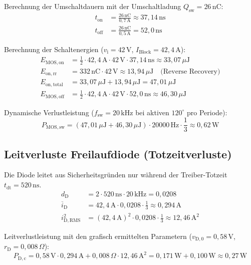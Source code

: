 Berechnung der Umschaltdauern mit der Umschaltladung $Q_{\mathrm{sw}} = 26\,\mathrm{nC}$:
\begin{align}
    t_{\mathrm{on}} &= \frac{26\,\mathrm{nC}}{0{,}7\,\mathrm{A}} \approx 37{,}14\,\mathrm{ns} \\
    t_{\mathrm{off}} &= \frac{26\,\mathrm{nC}}{0{,}5\,\mathrm{A}} = 52{,}0\,\mathrm{ns}
\end{align}

Berechnung der Schaltenergien ($v_{\mathrm{i}} = 42\,\mathrm{V}$, $I_{\mathrm{Block}} = 42{,}4\,\mathrm{A}$):
\begin{align}
    E_{\mathrm{MOS,on}} &= \frac{1}{2} \cdot 42{,}4\,\mathrm{A} \cdot 42\,\mathrm{V} \cdot 37{,}14\,\mathrm{ns} \approx 33{,}07\,\mu\mathrm{J} \\
    E_{\mathrm{on,rr}} &= 332\,\mathrm{nC} \cdot 42\,\mathrm{V} \approx 13{,}94\,\mu\mathrm{J} \quad \text{(Reverse Recovery)} \\
    E_{\mathrm{on,total}} &= 33{,}07\,\mu\mathrm{J} + 13{,}94\,\mu\mathrm{J} = 47{,}01\,\mu\mathrm{J} \\
    E_{\mathrm{MOS,off}} &= \frac{1}{2} \cdot 42{,}4\,\mathrm{A} \cdot 42\,\mathrm{V} \cdot 52{,}0\,\mathrm{ns} \approx 46{,}30\,\mu\mathrm{J}
\end{align}

Dynamische Verlustleistung ($f_{\mathrm{sw}} = 20\,\mathrm{kHz}$ bei aktiven $120^\circ$ pro Periode):
\begin{equation}
    P_{\mathrm{MOS,sw}} = (47{,}01\,\mu\mathrm{J} + 46{,}30\,\mu\mathrm{J}) \cdot 20000\,\mathrm{Hz} \cdot \frac{1}{3} \approx 0{,}62\,\mathrm{W}
\end{equation}

\subsection{Leitverluste Freilaufdiode (Totzeitverluste)}
Die Diode leitet aus Sicherheitsgründen nur während der Treiber-Totzeit $t_{\mathrm{dt}} = 520\,\mathrm{ns}$.
\begin{align}
    d_{\mathrm{D}} &= 2 \cdot 520\,\mathrm{ns} \cdot 20\,\mathrm{kHz} = 0{,}0208 \\
    \overline{i}_{\mathrm{D}} &= 42{,}4\,\mathrm{A} \cdot 0{,}0208 \cdot \frac{1}{3} \approx 0{,}294\,\mathrm{A} \\
    i_{\mathrm{D,RMS}}^2 &= (42{,}4\,\mathrm{A})^2 \cdot 0{,}0208 \cdot \frac{1}{3} \approx 12{,}46\,\mathrm{A}^2
\end{align}

Leitverlustleistung mit den grafisch ermittelten Parametern ($v_{\mathrm{D,0}} = 0{,}58\,\mathrm{V}$, $r_{\mathrm{D}} = 0{,}008\,\Omega$):
\begin{equation}
    P_{\mathrm{D,c}} = 0{,}58\,\mathrm{V} \cdot 0{,}294\,\mathrm{A} + 0{,}008\,\Omega \cdot 12{,}46\,\mathrm{A}^2 = 0{,}171\,\mathrm{W} + 0{,}100\,\mathrm{W} \approx 0{,}27\,\mathrm{W}
\end{equation}